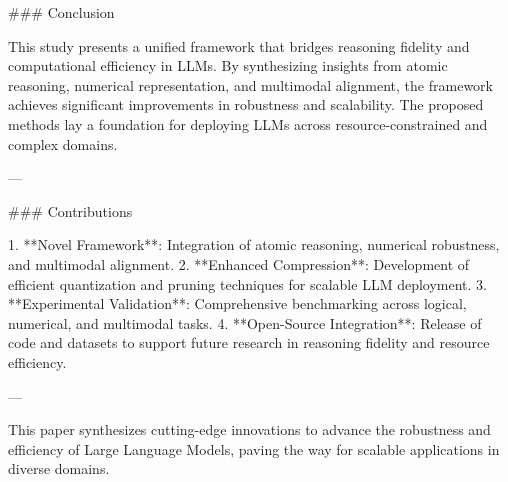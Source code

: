 ### Conclusion

This study presents a unified framework that bridges reasoning fidelity and computational efficiency in LLMs. By synthesizing insights from atomic reasoning, numerical representation, and multimodal alignment, the framework achieves significant improvements in robustness and scalability. The proposed methods lay a foundation for deploying LLMs across resource-constrained and complex domains.

---

### Contributions

1. **Novel Framework**: Integration of atomic reasoning, numerical robustness, and multimodal alignment.
2. **Enhanced Compression**: Development of efficient quantization and pruning techniques for scalable LLM deployment.
3. **Experimental Validation**: Comprehensive benchmarking across logical, numerical, and multimodal tasks.
4. **Open-Source Integration**: Release of code and datasets to support future research in reasoning fidelity and resource efficiency.

--- 

This paper synthesizes cutting-edge innovations to advance the robustness and efficiency of Large Language Models, paving the way for scalable applications in diverse domains.
